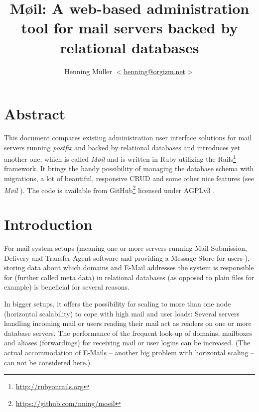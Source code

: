 \documentclass[12pt,a4paper]{scrartcl}
\begin{document}
	\title{Møil: A web-based administration tool for mail servers backed by relational databases}
	\author{Henning Müller $<$\href{mailto:henning@orgizm.net}{henning@orgizm.net}$>$}
	\date{}

	\maketitle

	\tableofcontents


	\section{Abstract}
		This document compares existing administration user interface solutions
		for mail servers running \emph{postfix} and backed by relational
		databases and introduces yet another one, which is called \emph{Møil}
		and is written in Ruby utilizing the
		\ac{Rails}\footnote{\url{http://rubyonrails.org}} framework. It brings
		the handy possibility of managing the database schema with migrations,
		a lot of beautiful, responsive \acs{CRUD} and some other nice features
		(see \emph{Møil} ). The code is available
		from GitHub\footnote{\url{https://github.com/nning/moeil}} licensed
		under AGPLv3 \cite{agpl}.

	\section{Introduction}

		For mail system setups (meaning one or more servers running Mail
		Submission, Delivery and Transfer Agent software and providing a
		Message Store for users \cite{mail-architecture}), storing data about
		which domains and E-Mail addresses the system is responsible for
		(further called meta data) in relational databases (as opposed to plain
		files for example) is beneficial for several reasons.


		In bigger setups, it offers the possibility for scaling to more than
		one node (horizontal scalability) to cope with high mail and user
		loads: Several servers handling incoming mail or users reading their
		mail act as readers on one or more database servers. The performance of
		the frequent look-up of domains, mailboxes and aliases (forwardings)
		for receiving mail or user logins can be increased. (The actual
		accommodation of E-Mails -- another big problem with horizontal scaling
		-- can not be considered here.)
\end{document}
